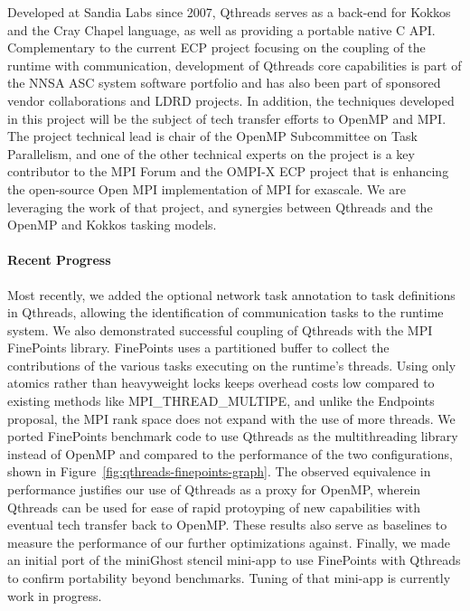 Developed at Sandia Labs since 2007, Qthreads serves as a back-end for Kokkos and the Cray Chapel language, as well as providing a portable native C API. Complementary to the current ECP project focusing on the coupling of the runtime with communication, development of Qthreads core capabilities is part of the NNSA ASC system software portfolio and has also been part of sponsored vendor collaborations and LDRD projects.  In addition, the techniques developed in this project will be the subject of tech transfer efforts to OpenMP and MPI.  The project technical lead is chair of the OpenMP Subcommittee on Task Parallelism, and one of the other technical experts on the project is a key contributor to the MPI Forum and the OMPI-X ECP project that is enhancing the open-source Open MPI implementation of MPI for exascale.  We are leveraging the work of that project, and synergies between Qthreads and the OpenMP and Kokkos tasking models.


\paragraph{Recent Progress}

Most recently, we added the optional network task annotation to task definitions in Qthreads, allowing the identification of communication tasks to the runtime system.  We also demonstrated successful coupling of Qthreads with the MPI FinePoints library.  FinePoints uses a partitioned buffer to collect the contributions of the various tasks executing on the runtime’s threads.  Using only atomics rather than heavyweight locks keeps overhead costs low compared to existing methods like MPI\_THREAD\_MULTIPE, and unlike the Endpoints proposal, the MPI rank space does not expand with the use of more threads.  We ported FinePoints benchmark code to use Qthreads as the multithreading library instead of OpenMP and compared to the performance of the two configurations, shown in Figure~\ref{fig:qthreads-finepoints-graph}. The observed equivalence in performance justifies our use of Qthreads as a proxy for OpenMP, wherein Qthreads can be used for ease of rapid protoyping of new capabilities with eventual tech transfer back to OpenMP.  These results also serve as baselines to measure the performance of our further optimizations against.  Finally, we made an initial port of the miniGhost stencil mini-app to use FinePoints with Qthreads to confirm portability beyond benchmarks.  Tuning of that mini-app is currently work in progress.

